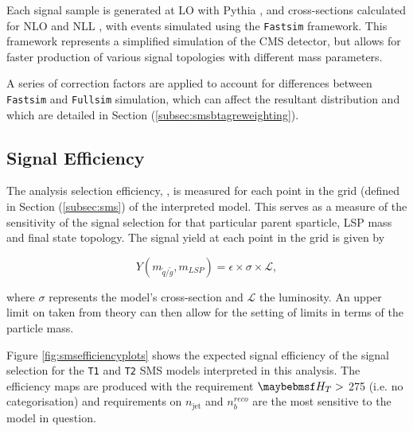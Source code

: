 Each signal sample is generated at \acf{LO} with Pythia \cite{Sjostrand:2006za}, and cross-sections calculated for \acf{NLO} and \acf{NLL} \cite{Beenakker:1996ch}, with events simulated using the \texttt{Fastsim} framework. This framework represents a simplified simulation of the \ac{CMS} detector, but allows for faster production of various signal topologies with different mass parameters. 

A series of correction factors are applied to account for differences between \texttt{Fastsim} \cite{1742-6596-331-3-032049} and \texttt{Fullsim} \cite{1742-6596-331-3-032015} simulation, which can affect the resultant \nbreco distribution and which are detailed in Section (\ref{subsec:smsbtagreweighting}). 

\subsection{Signal Efficiency}

The analysis selection efficiency, \epsilon, is measured for each point in the grid (defined in Section (\ref{subsec:sms}) of the interpreted model. This serves as a measure of the sensitivity of the signal selection for that particular parent sparticle, \ac{LSP} mass and final state topology. The signal yield at each point in the grid is given by 

\begin{equation}
Y(m_{\widetilde{q}/\widetilde{g}},m_{LSP}) = \epsilon \times \sigma \times \mathcal{L},
\end{equation}

where $\sigma$ represents the model's cross-section and $\mathcal{L}$ the luminosity. An upper limit on \sigma taken from theory can then allow for the setting of limits in terms of the particle mass. 

Figure \ref{fig:smsefficiencyplots} shows the expected signal efficiency of the signal selection for the \texttt{T1} and \texttt{T2} \ac{SMS} models interpreted in this analysis. The efficiency maps are produced with the requirement $\theht >$ 275 \GeV (i.e. no \theht categorisation) and requirements on $n_{\text{jet}}$ and $n_{b}^{reco}$ are the most sensitive to the model in question.

